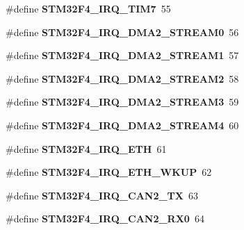 \begin{DoxyCompactItemize}
\#define {\bfseries S\+T\+M32\+F4\+\_\+\+I\+R\+Q\+\_\+\+T\+I\+M7}~55
\item 
\mbox{\label{group__stm32f4__interrupt_ga3fd8853ad2ca59c0906f6e92ea99a253}} 
\#define {\bfseries S\+T\+M32\+F4\+\_\+\+I\+R\+Q\+\_\+\+D\+M\+A2\+\_\+\+S\+T\+R\+E\+A\+M0}~56
\item 
\mbox{\label{group__stm32f4__interrupt_ga0d4aee134b0e3d3efd7e7ff72235cf88}} 
\#define {\bfseries S\+T\+M32\+F4\+\_\+\+I\+R\+Q\+\_\+\+D\+M\+A2\+\_\+\+S\+T\+R\+E\+A\+M1}~57
\item 
\mbox{\label{group__stm32f4__interrupt_ga0ccf873d7c3de02514e68d8c4d44291b}} 
\#define {\bfseries S\+T\+M32\+F4\+\_\+\+I\+R\+Q\+\_\+\+D\+M\+A2\+\_\+\+S\+T\+R\+E\+A\+M2}~58
\item 
\mbox{\label{group__stm32f4__interrupt_ga3d1ca976a7e77090b9139ba8366af746}} 
\#define {\bfseries S\+T\+M32\+F4\+\_\+\+I\+R\+Q\+\_\+\+D\+M\+A2\+\_\+\+S\+T\+R\+E\+A\+M3}~59
\item 
\mbox{\label{group__stm32f4__interrupt_ga13f3974b38bf5c2014d083d0697b03dd}} 
\#define {\bfseries S\+T\+M32\+F4\+\_\+\+I\+R\+Q\+\_\+\+D\+M\+A2\+\_\+\+S\+T\+R\+E\+A\+M4}~60
\item 
\mbox{\label{group__stm32f4__interrupt_ga155d276a6518a9214fbdbba16faebf46}} 
\#define {\bfseries S\+T\+M32\+F4\+\_\+\+I\+R\+Q\+\_\+\+E\+TH}~61
\item 
\mbox{\label{group__stm32f4__interrupt_gaa1a4338414880a6504552c0a8d57afa7}} 
\#define {\bfseries S\+T\+M32\+F4\+\_\+\+I\+R\+Q\+\_\+\+E\+T\+H\+\_\+\+W\+K\+UP}~62
\item 
\mbox{\label{group__stm32f4__interrupt_gaf7841cb5e644f8d8d5ac0d834f1201c8}} 
\#define {\bfseries S\+T\+M32\+F4\+\_\+\+I\+R\+Q\+\_\+\+C\+A\+N2\+\_\+\+TX}~63
\item 
\mbox{\label{group__stm32f4__interrupt_ga0c2a262b7baafaf5caaad14f058fdf48}} 
\#define {\bfseries S\+T\+M32\+F4\+\_\+\+I\+R\+Q\+\_\+\+C\+A\+N2\+\_\+\+R\+X0}~64

\end{DoxyCompactItemize}
